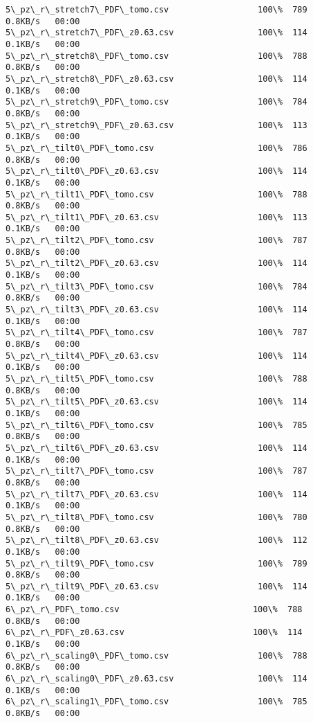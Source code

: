 \documentclass[11pt]{article}
\begin{document}
\begin{Verbatim}[commandchars=\\\{\}]
5\_pz\_r\_stretch7\_PDF\_tomo.csv                  100\%  789     0.8KB/s   00:00    
5\_pz\_r\_stretch7\_PDF\_z0.63.csv                 100\%  114     0.1KB/s   00:00    
5\_pz\_r\_stretch8\_PDF\_tomo.csv                  100\%  788     0.8KB/s   00:00    
5\_pz\_r\_stretch8\_PDF\_z0.63.csv                 100\%  114     0.1KB/s   00:00    
5\_pz\_r\_stretch9\_PDF\_tomo.csv                  100\%  784     0.8KB/s   00:00    
5\_pz\_r\_stretch9\_PDF\_z0.63.csv                 100\%  113     0.1KB/s   00:00    
5\_pz\_r\_tilt0\_PDF\_tomo.csv                     100\%  786     0.8KB/s   00:00    
5\_pz\_r\_tilt0\_PDF\_z0.63.csv                    100\%  114     0.1KB/s   00:00    
5\_pz\_r\_tilt1\_PDF\_tomo.csv                     100\%  788     0.8KB/s   00:00    
5\_pz\_r\_tilt1\_PDF\_z0.63.csv                    100\%  113     0.1KB/s   00:00    
5\_pz\_r\_tilt2\_PDF\_tomo.csv                     100\%  787     0.8KB/s   00:00    
5\_pz\_r\_tilt2\_PDF\_z0.63.csv                    100\%  114     0.1KB/s   00:00    
5\_pz\_r\_tilt3\_PDF\_tomo.csv                     100\%  784     0.8KB/s   00:00    
5\_pz\_r\_tilt3\_PDF\_z0.63.csv                    100\%  114     0.1KB/s   00:00    
5\_pz\_r\_tilt4\_PDF\_tomo.csv                     100\%  787     0.8KB/s   00:00    
5\_pz\_r\_tilt4\_PDF\_z0.63.csv                    100\%  114     0.1KB/s   00:00    
5\_pz\_r\_tilt5\_PDF\_tomo.csv                     100\%  788     0.8KB/s   00:00    
5\_pz\_r\_tilt5\_PDF\_z0.63.csv                    100\%  114     0.1KB/s   00:00    
5\_pz\_r\_tilt6\_PDF\_tomo.csv                     100\%  785     0.8KB/s   00:00    
5\_pz\_r\_tilt6\_PDF\_z0.63.csv                    100\%  114     0.1KB/s   00:00    
5\_pz\_r\_tilt7\_PDF\_tomo.csv                     100\%  787     0.8KB/s   00:00    
5\_pz\_r\_tilt7\_PDF\_z0.63.csv                    100\%  114     0.1KB/s   00:00    
5\_pz\_r\_tilt8\_PDF\_tomo.csv                     100\%  780     0.8KB/s   00:00    
5\_pz\_r\_tilt8\_PDF\_z0.63.csv                    100\%  112     0.1KB/s   00:00    
5\_pz\_r\_tilt9\_PDF\_tomo.csv                     100\%  789     0.8KB/s   00:00    
5\_pz\_r\_tilt9\_PDF\_z0.63.csv                    100\%  114     0.1KB/s   00:00    
6\_pz\_r\_PDF\_tomo.csv                           100\%  788     0.8KB/s   00:00    
6\_pz\_r\_PDF\_z0.63.csv                          100\%  114     0.1KB/s   00:00    
6\_pz\_r\_scaling0\_PDF\_tomo.csv                  100\%  788     0.8KB/s   00:00    
6\_pz\_r\_scaling0\_PDF\_z0.63.csv                 100\%  114     0.1KB/s   00:00    
6\_pz\_r\_scaling1\_PDF\_tomo.csv                  100\%  785     0.8KB/s   00:00    

\end{Verbatim}
\end{document}
